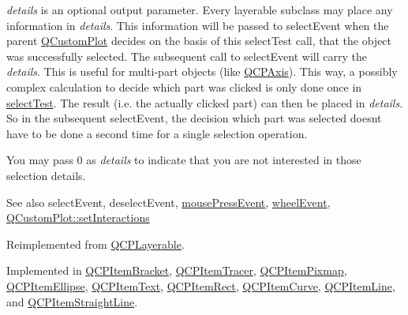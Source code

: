 {\itshape details} is an optional output parameter. Every layerable subclass may place any information in {\itshape details}. This information will be passed to select\+Event when the parent \mbox{\hyperlink{class_q_custom_plot}{Q\+Custom\+Plot}} decides on the basis of this select\+Test call, that the object was successfully selected. The subsequent call to select\+Event will carry the {\itshape details}. This is useful for multi-\/part objects (like \mbox{\hyperlink{class_q_c_p_axis}{Q\+C\+P\+Axis}}). This way, a possibly complex calculation to decide which part was clicked is only done once in \mbox{\hyperlink{class_q_c_p_abstract_item_ae41d0349d68bb802c49104afd100ba2a}{select\+Test}}. The result (i.\+e. the actually clicked part) can then be placed in {\itshape details}. So in the subsequent select\+Event, the decision which part was selected doesn\textquotesingle{}t have to be done a second time for a single selection operation.

You may pass 0 as {\itshape details} to indicate that you are not interested in those selection details.

\begin{DoxySeeAlso}{See also}
select\+Event, deselect\+Event, \mbox{\hyperlink{class_q_c_p_layerable_af6567604818db90f4fd52822f8bc8376}{mouse\+Press\+Event}}, \mbox{\hyperlink{class_q_c_p_layerable_a47dfd7b8fd99c08ca54e09c362b6f022}{wheel\+Event}}, \mbox{\hyperlink{class_q_custom_plot_a5ee1e2f6ae27419deca53e75907c27e5}{Q\+Custom\+Plot\+::set\+Interactions}} 
\end{DoxySeeAlso}


Reimplemented from \mbox{\hyperlink{class_q_c_p_layerable_a04db8351fefd44cfdb77958e75c6288e}{Q\+C\+P\+Layerable}}.



Implemented in \mbox{\hyperlink{class_q_c_p_item_bracket_a49a6b2f41e0a8c2a2e3a2836027a8455}{Q\+C\+P\+Item\+Bracket}}, \mbox{\hyperlink{class_q_c_p_item_tracer_a9fd955fea40e977d66f3a9fd5765aec4}{Q\+C\+P\+Item\+Tracer}}, \mbox{\hyperlink{class_q_c_p_item_pixmap_a65d1ede7bb479b90d40186d083071947}{Q\+C\+P\+Item\+Pixmap}}, \mbox{\hyperlink{class_q_c_p_item_ellipse_ab6e2b8a29695c606c7731e498297ca29}{Q\+C\+P\+Item\+Ellipse}}, \mbox{\hyperlink{class_q_c_p_item_text_a676aaec10ad3cc4d7d0e4847db04c838}{Q\+C\+P\+Item\+Text}}, \mbox{\hyperlink{class_q_c_p_item_rect_a2e68621b75bae4da6ae0ab2cdd0dd733}{Q\+C\+P\+Item\+Rect}}, \mbox{\hyperlink{class_q_c_p_item_curve_a718fa40140a43c8afbd41a3d85c92d72}{Q\+C\+P\+Item\+Curve}}, \mbox{\hyperlink{class_q_c_p_item_line_a8e02bfbca04fbcf3dbc375a2bf693229}{Q\+C\+P\+Item\+Line}}, and \mbox{\hyperlink{class_q_c_p_item_straight_line_a2e36c9d4dcc3aeda78a5584f790e39e3}{Q\+C\+P\+Item\+Straight\+Line}}.

